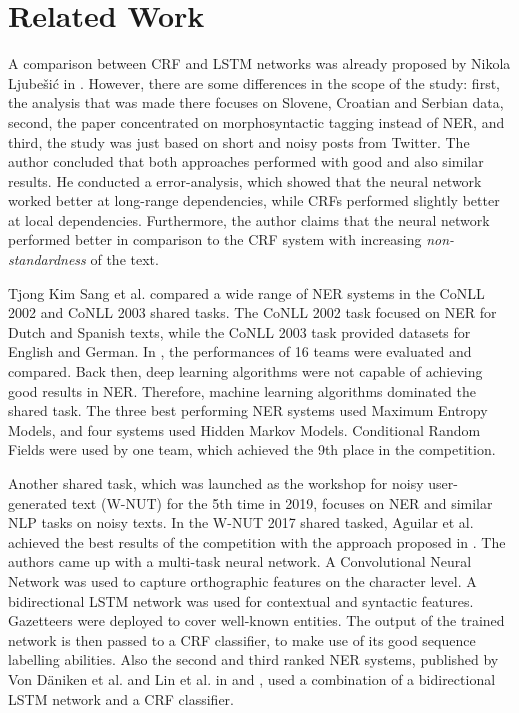\documentclass[12pt]{book}
\begin{document}
	\section{Related Work}
	\label{sec:relatedwork}
	
	A comparison between CRF and LSTM networks was already proposed by Nikola Ljube{\v{s}}i{\'c} in \cite{ljubevsic2018comparing}. However, there are some differences in the scope of the study: first, the analysis that was made there focuses on Slovene, Croatian and Serbian data, second, the paper concentrated on morphosyntactic tagging instead of NER, and third, the study was just based on short and noisy posts from Twitter. The author concluded that both approaches performed with good and also similar results. He conducted a error-analysis, which showed that the neural network worked better at long-range dependencies, while CRFs performed slightly better at local dependencies. Furthermore, the author claims that the neural network performed better in comparison to the CRF system with increasing \textit{non-standardness} of the text.
	
	Tjong Kim Sang et al. compared a wide range of NER systems in the CoNLL 2002 \cite{sangerik} and CoNLL 2003 \cite{tjongkimsang2003conll} shared tasks. The CoNLL 2002 task focused on NER for Dutch and Spanish texts, while the CoNLL 2003 task provided datasets for English and German. 
	In \cite{tjongkimsang2003conll}, the performances of 16 teams were evaluated and compared. Back then, deep learning algorithms were not capable of achieving good results in NER. Therefore, machine learning algorithms dominated the shared task. The three best performing NER systems used Maximum Entropy Models, and four systems used Hidden Markov Models. Conditional Random Fields were used by one team, which achieved the 9th place in the competition.
	
	Another shared task, which was launched as the workshop for noisy user-generated text (W-NUT) for the 5th time in 2019, focuses on NER and similar NLP tasks on noisy texts.
	In the W-NUT 2017 \cite{derczynski2017results} shared tasked, Aguilar et al. achieved the best results of the competition with the approach proposed in \cite{aguilar2019multi}. The authors came up with a multi-task neural network. A Convolutional Neural Network was used to capture orthographic features on the character level. A bidirectional LSTM network was used for contextual and syntactic features. Gazetteers were deployed to cover well-known entities. The output of the trained network is then passed to a CRF classifier, to make use of its good sequence labelling abilities. Also the second and third ranked NER systems, published by Von D{\"a}niken et al. and Lin et al. in \cite{von2017transfer} and \cite{lin2017multi}, used a combination of a bidirectional LSTM network and a CRF classifier.
	
\end{document}
